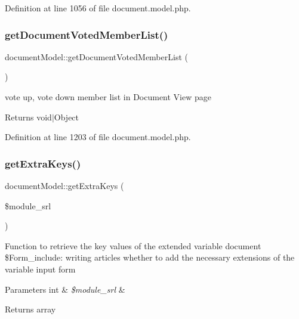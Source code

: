 Definition at line 1056 of file document.\+model.\+php.

\mbox{\label{classdocumentModel_ab0f8e68c8df234d70ce66bd286df3015}} 
\subsubsection{\texorpdfstring{get\+Document\+Voted\+Member\+List()}{getDocumentVotedMemberList()}}
{\footnotesize\ttfamily document\+Model\+::get\+Document\+Voted\+Member\+List (\begin{DoxyParamCaption}{ }\end{DoxyParamCaption})}

vote up, vote down member list in Document View page \begin{DoxyReturn}{Returns}
void$\vert$\+Object 
\end{DoxyReturn}


Definition at line 1203 of file document.\+model.\+php.

\mbox{\label{classdocumentModel_a6ba19d36ef767c052851a630823c300a}} 
\subsubsection{\texorpdfstring{get\+Extra\+Keys()}{getExtraKeys()}}
{\footnotesize\ttfamily document\+Model\+::get\+Extra\+Keys (\begin{DoxyParamCaption}\item[{}]{\$module\+\_\+srl }\end{DoxyParamCaption})}

Function to retrieve the key values of the extended variable document \$\+Form\+\_\+include\+: writing articles whether to add the necessary extensions of the variable input form 
\begin{DoxyParams}[1]{Parameters}
int & {\em \$module\+\_\+srl} & \\
\hline
\end{DoxyParams}
\begin{DoxyReturn}{Returns}
array 
\end{DoxyReturn}


